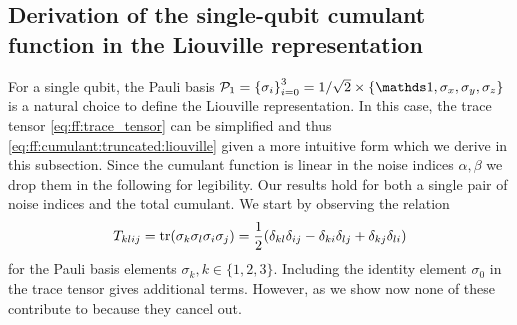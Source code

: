\subsection{Derivation of the single-qubit cumulant function in the Liouville representation}\label{subsec:app:ff:derivations:cumulant:pauli}
For a single qubit, the Pauli basis $\mc{P}_1 = \left\lbrace\sigma_i\right\rbrace_{i=0}^3 = 1/\sqrt{2}\times\left\lbrace\eye,\sx,\sy,\sz\right\rbrace$ is a natural choice to define the Liouville representation.
In this case, the trace tensor \cref{eq:ff:trace_tensor} can be simplified and thus \cref{eq:ff:cumulant:truncated:liouville} given a more intuitive form which we derive in this subsection.
Since the cumulant function is linear in the noise indices $\alpha,\beta$ we drop them in the following for legibility.
Our results hold for both a single pair of noise indices and the total cumulant.
We start by observing the relation
\begin{equation}\label{eq:ff:trace_tensor:four_paulis}
    T_{klij} = \tr(\sigma_k\sigma_l\sigma_i\sigma_j) = \frac{1}{2}(\delta_{kl}\delta_{ij} - \delta_{ki}\delta_{lj} + \delta_{kj}\delta_{li})
\end{equation}
for the Pauli basis elements $\sigma_k, k\in\lbrace 1, 2, 3\rbrace$.
Including the identity element $\sigma_0$ in the trace tensor gives additional terms.
However, as we show now none of these contribute to \cumulantfun because they cancel out.

